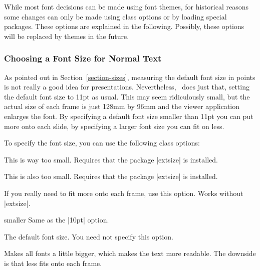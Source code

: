 While most font decisions can be made using font themes, for historical reasons some changes can only be made using class options or by loading special packages. These options are explained in the following. Possibly, these options will be replaced by themes in the future.

\subsubsection{Choosing a Font Size for Normal Text}

As pointed out in Section~\ref{section-sizes}, measuring the default font size in points is not really a good idea for presentations. Nevertheless, \beamer\ does just that, setting the default font size to 11pt as usual. This may seem ridiculously small, but the actual size of each frame is just 128mm by 96mm and the viewer application enlarges the font. By specifying a default font size smaller than 11pt you can put more onto each slide, by specifying a larger font size you can fit on less.

To specify the font size, you can use the following class options:

\begin{classoption}{8pt}
  This is way too small. Requires that the package |extsize| is installed.
\end{classoption}

\begin{classoption}{9pt}
  This is also too small. Requires that the package |extsize| is installed.
\end{classoption}

\begin{classoption}{10pt}
  If you really need to fit more onto each frame, use this option. Works without |extsize|.
\end{classoption}

\begin{classoption}{smaller}
  Same as the |10pt| option. \end{classoption}

\begin{classoption}{11pt}
  The default font size. You need not specify this option.
\end{classoption}

\begin{classoption}{12pt}
  Makes all fonts a little bigger, which makes the text more readable. The downside is that less fits onto each frame.
\end{classoption}

